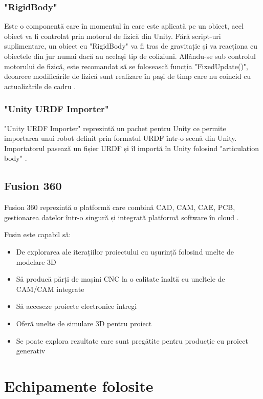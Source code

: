\subsubsection{"RigidBody"} 
Este o componentă care în momentul în care este aplicată pe un obiect, acel obiect va fi controlat prin motorul de fizică din Unity. Fără script-uri suplimentare, un obiect cu "RigidBody" va fi tras de gravitație și va reacționa cu obiectele din jur numai dacă au același tip de coliziuni. Aflându-se sub controlul motorului de fizică, este recomandat să se folosească funcția "FixedUpdate()", deoarece modificările de fizică sunt realizare în pași de timp care nu coincid cu actualizările de cadru \cite{RB}.




\subsubsection{"Unity URDF Importer"}
"Unity URDF Importer" reprezintă un pachet pentru Unity ce permite importarea unui robot definit prin formatul URDF într-o scenă din Unity. Importatorul pasează un fișier URDF și îl importă în Unity folosind "articulation body" \cite{UU}.

\subsection{Fusion 360}
Fusion 360 reprezintă o platformă care combină CAD, CAM, CAE, PCB, gestionarea datelor într-o singură și integrată platformă software în cloud \cite{Fusion}.

Fusin este capabil să:
\begin{itemize}
	\item De explorarea ale iterațiilor  proiectului cu ușurință folosind unelte de modelare 3D \cite{Fusion}
	\item Să producă părți de mașini CNC la o calitate înaltă cu uneltele de CAM/CAM integrate \cite{Fusion}
	\item Să acceseze proiecte electronice întregi \cite{Fusion}
	\item Oferă unelte de simulare 3D pentru proiect \cite{Fusion}
	\item Se poate explora rezultate care sunt pregătite pentru producție cu proiect generativ  \cite{Fusion}
\end{itemize}

\newpage
\section{Echipamente folosite}

